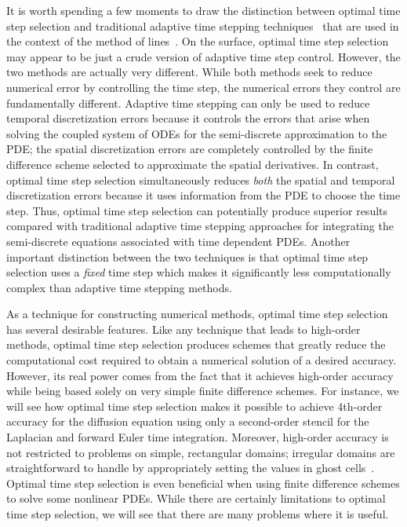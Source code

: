 \documentclass[oneeqnum,onefignum,onetabnum,onethmnum]{siamltex}
\begin{document}
It is worth spending a few moments to draw the distinction between optimal 
time step selection and traditional adaptive time stepping 
techniques~\cite{iserles_book, shampine_2005} that are used in the 
context of the method 
of lines~\cite{iserles_book, gko_book}.  On the surface, optimal time step 
selection may appear to be just a crude version of adaptive time step control.
However, the two methods are actually very different.  While both methods seek 
to reduce numerical error by controlling the time step, the numerical errors 
they control are fundamentally different.  Adaptive time stepping can only 
be used to reduce temporal discretization errors because it controls the 
errors that arise when solving the coupled system of ODEs for the 
semi-discrete approximation to the PDE; the spatial discretization errors 
are completely controlled by the finite difference scheme selected to 
approximate the spatial derivatives.  
In contrast, optimal time step selection simultaneously reduces 
\emph{both} the spatial and temporal discretization errors because it
uses information from the PDE to choose the time step.  Thus, optimal time 
step selection can potentially produce superior results compared with 
traditional adaptive time stepping approaches for integrating the 
semi-discrete equations associated with time dependent PDEs.  Another 
important distinction between the two techniques is that optimal time step 
selection uses a \emph{fixed} time step which makes it significantly less 
computationally complex than adaptive time stepping methods.

As a technique for constructing numerical methods, optimal time step selection 
has several desirable features.  Like any technique that leads to high-order 
methods, optimal time step selection produces schemes that greatly reduce the 
computational cost required to obtain a numerical solution of a desired 
accuracy.  However, its real power comes from the fact that it achieves
high-order accuracy while being based solely on very simple finite difference 
schemes.  For instance, we will see how optimal time step selection makes 
it possible to achieve 4th-order accuracy for the diffusion equation using only 
a second-order stencil for the Laplacian and forward Euler time integration.  
Moreover, high-order accuracy is not restricted to problems on simple, 
rectangular domains; irregular domains are straightforward to handle by
appropriately setting the values in ghost cells~\cite{gibou_2005, fedkiw_1999, 
osher_fedkiw_book}.  Optimal time step selection is even beneficial when 
using finite difference schemes to solve some nonlinear PDEs.  While there 
are certainly limitations to optimal time step selection, we will see that 
there are many problems where it is useful.  
\end{document}
